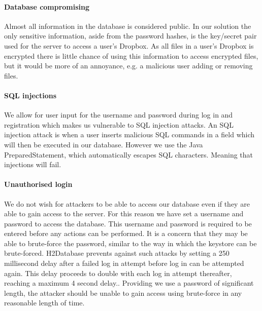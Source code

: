 \documentclass[12pt, titlepage]{article}
\begin{document}
\paragraph*{Database compromising} Almost all information in the database is considered public. In our solution the only sensitive information, aside from the password hashes, is the key/secret pair used for the server to access a user's Dropbox. As all files in a user's Dropbox is encrypted there is little chance of using this information to access encrypted files, but it would be more of an annoyance, e.g. a malicious user adding or removing files.

\paragraph*{SQL injections} We allow for user input for the username and password during log in and registration which makes us vulnerable to SQL injection attacks. An SQL injection attack is when a user inserts malicious SQL commands in a field which will then be executed in our database. However we use the Java PreparedStatement\cite{javaPreparedStatement}, which automatically escapes SQL characters\cite{owaspSQL}. Meaning that injections will fail. 

\paragraph*{Unauthorised login} We do not wish for attackers to be able to access our database even if they are able to gain access to the server. For this reason we have set a username and password to access the database. This username and password is required to be entered before any actions can be performed. It is a concern that they may be able to brute-force the password, similar to the way in which the keystore can be brute-forced. H2Database prevents against such attacks by setting a 250 millisecond delay after a failed log in attempt before log in can be attempted again. This delay proceeds to double with each log in attempt thereafter, reaching a maximum 4 second delay.\cite{h2Delay}. Providing we use a password of significant length, the attacker should be unable to gain access using brute-force in any reasonable length of time.
\end{document}
